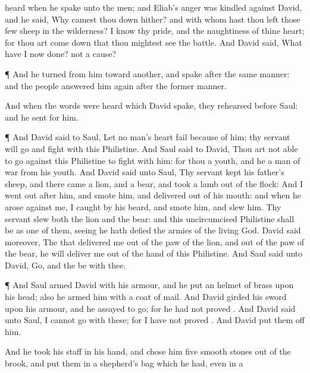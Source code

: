 {heard when he
spake unto the
men; and
Eliab’s
anger was
kindled against
David, and he
said, Why camest thou
down hither? and with whom hast thou
left
those
few
sheep in the
wilderness? I
know thy
pride, and the
naughtiness of thine
heart; for thou art come
down that thou mightest
see the
battle.
And
David
said, What have I now
done?
{} not a
cause?
\par }{\PP {}¶ And he
turned from
him
toward
another, and
spake after the same
manner: and the
people
answered him
again after the
former
manner.
\par }{\PP {}And when the
words were
heard which
David
spake, they
rehearsed
{}
before
Saul: and he
sent for him.
\par }{\PP {}¶ And
David
said to
Saul, Let no
man’s
heart
fail because of him; thy
servant will
go and
fight with this
Philistine.
And
Saul
said to
David, Thou art not
able to
go against this
Philistine to
fight with him: for thou
{} a
youth, and he a
man of
war from his
youth.
And
David
said unto
Saul, Thy
servant
kept his
father’s
sheep, and there
came a
lion, and a
bear, and
took a
lamb out of the
flock:
And I went
out
after him, and
smote him, and
delivered
{} out of his
mouth: and when he
arose against me, I
caught
{} by his
beard, and
smote him, and
slew him.
Thy
servant
slew both the
lion and the
bear: and this
uncircumcised
Philistine shall be as
one of them, seeing he hath
defied the
armies of the
living
God.
David
said moreover, The
{} that
delivered me out of the
paw of the
lion, and out of the
paw of the
bear, he will
deliver me out of the
hand of this
Philistine. And
Saul
said unto
David,
Go, and the
{} be with thee.
\par }{\PP {}¶ And
Saul
armed
David with his
armour, and he
put an
helmet of
brass upon his
head; also he
armed him with a coat of
mail.
And
David
girded his
sword upon his
armour, and he
assayed to
go; for he had not
proved
{}. And
David
said unto
Saul, I
cannot
go with these; for I have not
proved
{}. And
David
put them off him.
\par }{\PP {}And he
took his
staff in his
hand, and
chose him
five
smooth
stones out of the
brook, and
put them in a
shepherd’s
bag which he had, even in a
}
